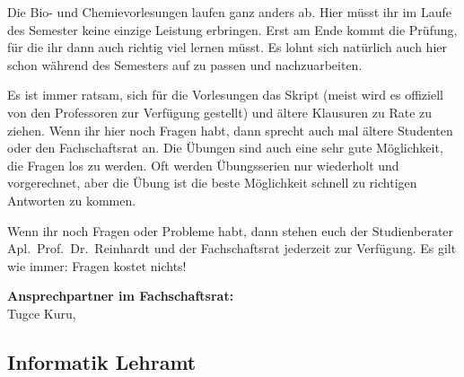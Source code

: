 Die Bio- und Chemievorlesungen laufen ganz anders ab.
Hier müsst ihr im Laufe des Semester keine einzige Leistung erbringen.
Erst am Ende kommt die Prüfung, für die ihr dann auch richtig viel lernen müsst.
Es lohnt sich natürlich auch hier schon während des Semesters auf zu passen und nachzuarbeiten.

Es ist immer ratsam, sich für die Vorlesungen das Skript (meist wird es offiziell von den Professoren zur Verfügung gestellt) und ältere Klausuren zu Rate zu ziehen.
Wenn ihr hier noch Fragen habt, dann sprecht auch mal ältere Studenten oder den Fachschaftsrat an.
Die Übungen sind auch eine sehr gute Möglichkeit, die Fragen los zu werden.
Oft werden Übungsserien nur wiederholt und vorgerechnet, aber die Übung ist die beste Möglichkeit schnell zu richtigen Antworten zu kommen.

Wenn ihr noch Fragen oder Probleme habt, dann stehen euch der Studienberater Apl.\ Prof.\ Dr.\ Reinhardt und der Fachschaftsrat jederzeit zur Verfügung.
Es gilt wie immer: Fragen kostet nichts!

\textbf{Ansprechpartner im Fachschaftsrat:}\\
Tugce Kuru, 



\newpage

\subsection{Informatik Lehramt}
\label{studiengang_infolehramt}

